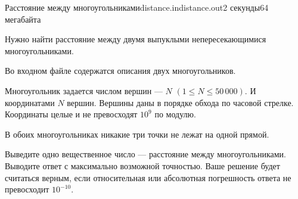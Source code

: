 \begin{problem}{Расстояние между многоугольниками}{distance.in}{distance.out}{2 секунды}{64 мегабайта}

Нужно найти расстояние между двумя выпуклыми непересекающимися многоугольниками.

\InputFile

Во входном файле содержатся описания двух многоугольников.

Многоугольник задается числом вершин --- $N$ $(1 \le N \le 50\,000)$. И координатами $N$ вершин.
Вершины даны в порядке обхода по часовой стрелке. Координаты целые и не превосходят $10^9$
по модулю.

В обоих многоугольниках никакие три точки не лежат на одной прямой.

\OutputFile

Выведите одно вещественное число --- расстояние между многоугольниками.
Выводите ответ с максимально возможной точностью.
Ваше решение будет считаться верным, если относительная или абсолютная погрешность ответа не превосходит $10^{-10}$.

\Example

\begin{example}%
%
\end{example}

\end{problem}
